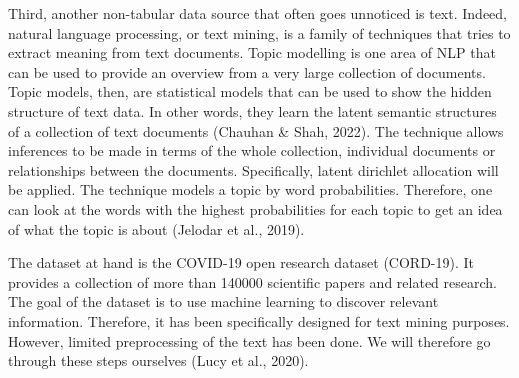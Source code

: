 \documentclass[10pt, a4paper, twocolumn]{article} %
\begin{document}
Third, another non-tabular data source that often goes unnoticed is text. Indeed, natural language processing, or text mining, is a family of techniques that tries to extract meaning from text documents. Topic modelling is one area of NLP that can be used to provide an overview from a very large collection of documents. Topic models, then, are statistical models that can be used to show the hidden structure of text data. In other words, they learn the latent semantic structures of a collection of text documents (Chauhan \& Shah, 2022).
The technique allows inferences to be made in terms of the whole collection, individual documents or relationships between the documents. Specifically, latent dirichlet allocation will be applied. The technique models a topic by word probabilities. Therefore, one can look at the words with the highest probabilities for each topic to get an idea of what the topic is about (Jelodar et al., 2019).

The dataset at hand is the COVID-19 open research dataset (CORD-19). It provides a collection of more than 140000 scientific papers and related research. The goal of the dataset is to use machine learning to discover relevant information. Therefore, it has been specifically designed for text mining purposes. However, limited preprocessing of the text has been done. We will therefore go through these steps ourselves (Lucy et al., 2020).
\end{document}
